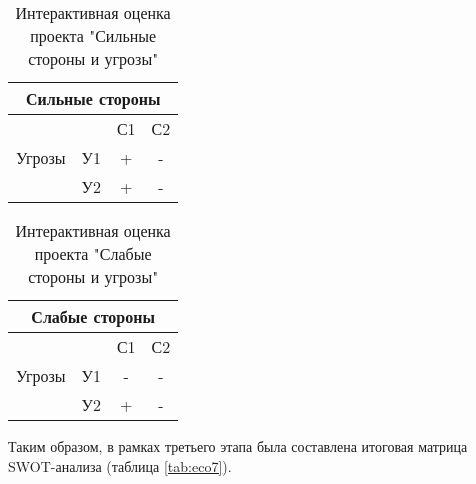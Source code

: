 \begin{table}[H]
\centering
\caption{Интерактивная оценка проекта "Сильные стороны и угрозы"}
\label{tab:eco5}
\begin{tabular}{|c|c|c|c|}
\hline
\multicolumn{4}{|c|}{Сильные стороны}   \\ \hline
\multirow{3}{*}{Угрозы} &    & С1 & С2 \\ \cline{2-4} 
                        & У1 & +  & -  \\ \cline{2-4} 
                        & У2 & +  & -  \\ \hline
\end{tabular}%
\end{table}

\begin{table}[H]
\centering
\caption{Интерактивная оценка проекта "Слабые стороны и угрозы"}
\label{tab:eco6}
\begin{tabular}{|c|c|c|c|}
\hline
\multicolumn{4}{|c|}{Слабые стороны}   \\ \hline
\multirow{3}{*}{Угрозы} &    & С1 & С2 \\ \cline{2-4} 
                        & У1 & -  & -  \\ \cline{2-4} 
                        & У2 & +  & -  \\ \hline
\end{tabular}%
\end{table}

Таким  образом,  в  рамках  третьего  этапа была составлена итоговая матрица SWOT-анализа (таблица \ref{tab:eco7}).

